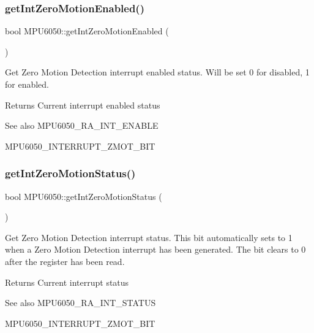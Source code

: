 \subsubsection{\texorpdfstring{getIntZeroMotionEnabled()}{getIntZeroMotionEnabled()}}
{\footnotesize\ttfamily bool M\+P\+U6050\+::get\+Int\+Zero\+Motion\+Enabled (\begin{DoxyParamCaption}{ }\end{DoxyParamCaption})}

Get Zero Motion Detection interrupt enabled status. Will be set 0 for disabled, 1 for enabled. \begin{DoxyReturn}{Returns}
Current interrupt enabled status 
\end{DoxyReturn}
\begin{DoxySeeAlso}{See also}
M\+P\+U6050\+\_\+\+R\+A\+\_\+\+I\+N\+T\+\_\+\+E\+N\+A\+B\+LE 

M\+P\+U6050\+\_\+\+I\+N\+T\+E\+R\+R\+U\+P\+T\+\_\+\+Z\+M\+O\+T\+\_\+\+B\+IT 
\end{DoxySeeAlso}
\mbox{\label{class_m_p_u6050_afa73a5ffdc423736ae88702a469ba3a0}} 
\subsubsection{\texorpdfstring{getIntZeroMotionStatus()}{getIntZeroMotionStatus()}}
{\footnotesize\ttfamily bool M\+P\+U6050\+::get\+Int\+Zero\+Motion\+Status (\begin{DoxyParamCaption}{ }\end{DoxyParamCaption})}

Get Zero Motion Detection interrupt status. This bit automatically sets to 1 when a Zero Motion Detection interrupt has been generated. The bit clears to 0 after the register has been read. \begin{DoxyReturn}{Returns}
Current interrupt status 
\end{DoxyReturn}
\begin{DoxySeeAlso}{See also}
M\+P\+U6050\+\_\+\+R\+A\+\_\+\+I\+N\+T\+\_\+\+S\+T\+A\+T\+US 

M\+P\+U6050\+\_\+\+I\+N\+T\+E\+R\+R\+U\+P\+T\+\_\+\+Z\+M\+O\+T\+\_\+\+B\+IT 
\end{DoxySeeAlso}
\mbox{\label{class_m_p_u6050_acd775c72f85dabfc6f8fba43da096c6d}} 
